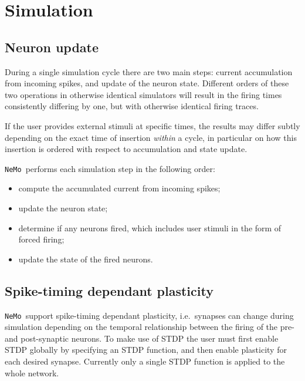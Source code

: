\documentclass[a4paper]{article}
\newcommand{\nemo}{\texttt{NeMo}}
\begin{document}
\maketitle

\section{Simulation}

\subsection{Neuron update}

During a single simulation cycle there are two main steps:
	current accumulation from incoming spikes,
	and update of the neuron state. 
Different orders of these two operations in otherwise identical simulators 
	will result in the firing times consistently differing by one,
	but with otherwise identical firing traces.

If the user provides external stimuli at specific times,
	the results may differ subtly depending on the exact time of insertion \emph{within} a cycle,
	in particular on how this insertion is ordered with respect to accumulation and state update.

\nemo\ performs each simulation step in the following order:

\begin{itemize}
	\item compute the accumulated current from incoming spikes;
	\item update the neuron state;
	\item determine if any neurons fired, which includes user stimuli in the form of forced firing;
	\item update the state of the fired neurons.
\end{itemize}

\subsection{Spike-timing dependant plasticity}
\label{stdp}

\nemo\ support spike-timing dependant plasticity,
	i.e.~synapses can change during simulation depending on the temporal relationship 
	between the firing of the pre- and post-synaptic neurons. 
To make use of STDP the user must first enable STDP globally by specifying an STDP function,
	and then enable plasticity for each desired synapse.
Currently only a single STDP function is applied to the whole network.
\end{document}
